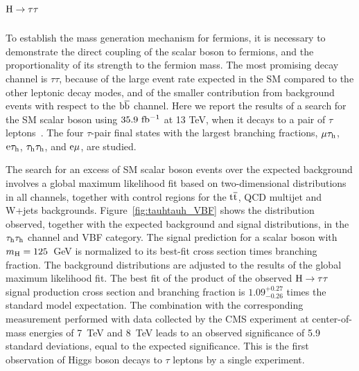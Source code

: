 \documentclass[10pt]{article}
\begin{document}
\section{\boldmath ${\rm H}\to\tau\tau$}

To establish the mass generation mechanism for fermions, it is necessary to
demonstrate the direct coupling of the scalar boson to fermions, and the
proportionality of its strength to the fermion mass. The most promising decay
channel is $\tau\tau$, because of the large event rate expected in the SM
compared to the other leptonic decay modes, and of the smaller contribution
from background events with respect to the ${\rm b\bar{b}}$ channel. Here we
report the results of a search for the SM scalar boson using $35.9~{\rm fb^{-1}}$
at 13 TeV, when it decays to a pair of $\tau$ leptons~\cite{Sirunyan:2017khh}. The
four $\tau$-pair final states with the largest branching fractions,
$\mu\tau_{\rm h}$, ${\rm e}\tau_{\rm h}$, $\tau_{\rm h}\tau_{\rm h}$, and
${\rm e}\mu$, are studied.

The search for an excess of SM scalar boson events over the expected background
involves a global maximum likelihood fit based on two-dimensional distributions
in all channels, together with control regions for the ${\rm t{\bar t}}$, QCD
multijet and W+jets backgrounds. Figure~\ref{fig:tauhtauh_VBF} shows the
distribution observed, together with the expected background and signal
distributions, in the $\tau_{\rm h}\tau_{\rm h}$ channel and VBF category. The
signal prediction for a scalar boson with $m_{\rm H} = 125$~GeV is
normalized to its best-fit cross section times branching fraction. The background
distributions are adjusted to the results of the global maximum likelihood fit.
The best fit of the product of the observed ${\rm H\to\tau\tau}$ signal
production cross section and branching fraction is $1.09_{-0.26}^{+0.27}$ times
the standard model expectation. The combination with the corresponding
measurement performed with data collected by the CMS experiment at
center-of-mass energies of 7~TeV and 8~TeV leads to an observed significance of
5.9 standard deviations, equal to the expected significance. This is the first
observation of Higgs boson decays to $\tau$ leptons by a single experiment.
\end{document}
